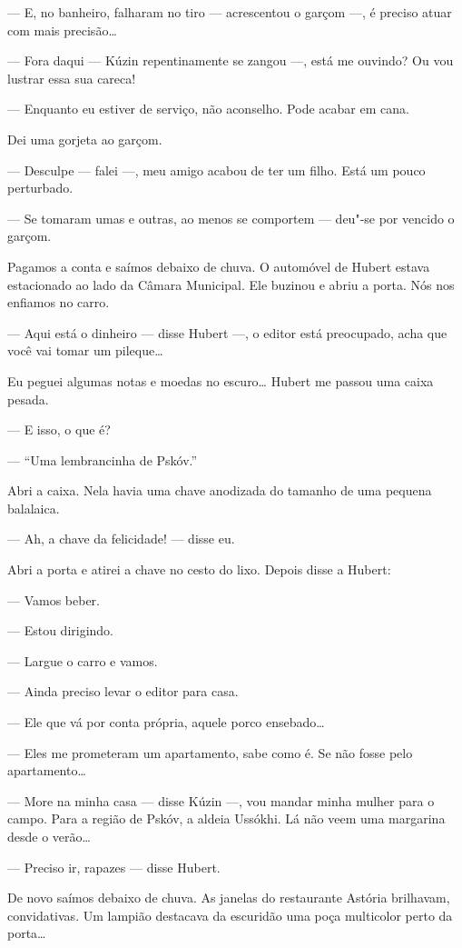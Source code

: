 --- E, no banheiro, falharam no tiro --- acrescentou o garçom ---, é
preciso atuar com mais precisão\ldots{}

--- Fora daqui --- Kúzin repentinamente se zangou ---, está me ouvindo?
Ou vou lustrar essa sua careca!

--- Enquanto eu estiver de serviço, não aconselho. Pode acabar em cana.

Dei uma gorjeta ao garçom.

--- Desculpe --- falei ---, meu amigo acabou de ter um filho. Está um
pouco perturbado.

--- Se tomaram umas e outras, ao menos se comportem --- deu"-se por
vencido o garçom.

Pagamos a conta e saímos debaixo de chuva. O automóvel de Hubert estava
estacionado ao lado da Câmara Municipal. Ele buzinou e abriu a porta.
Nós nos enfiamos no carro.

--- Aqui está o dinheiro --- disse Hubert ---, o editor está preocupado,
acha que você vai tomar um pileque\ldots{}

Eu peguei algumas notas e moedas no escuro\ldots{} Hubert me passou uma caixa
pesada.

--- E isso, o que é?

--- ``Uma lembrancinha de Pskóv.''

Abri a caixa. Nela havia uma chave anodizada do tamanho de uma pequena
balalaica.

--- Ah, a chave da felicidade! --- disse eu.

Abri a porta e atirei a chave no cesto do lixo. Depois disse a Hubert:

--- Vamos beber.

--- Estou dirigindo.

--- Largue o carro e vamos.

--- Ainda preciso levar o editor para casa.

--- Ele que vá por conta própria, aquele porco ensebado\ldots{}

--- Eles me prometeram um apartamento, sabe como é. Se não fosse pelo
apartamento\ldots{}

--- More na minha casa --- disse Kúzin ---, vou mandar minha mulher para
o campo. Para a região de Pskóv, a aldeia Ussókhi. Lá não veem uma
margarina desde o verão\ldots{}

--- Preciso ir, rapazes --- disse Hubert.

De novo saímos debaixo de chuva. As janelas do restaurante Astória
brilhavam, convidativas. Um lampião destacava da escuridão uma poça
multicolor perto da porta\ldots{}

